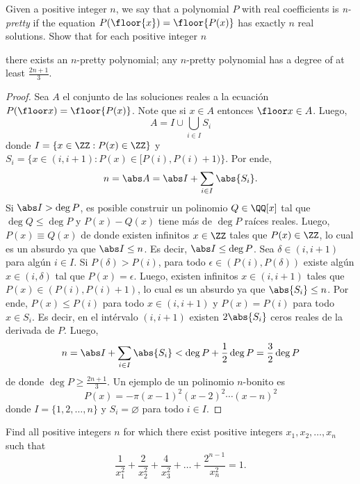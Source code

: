 \begin{probMB}[MEMO 2021 T-2]
	Given a positive integer $n$, we say that a polynomial $P$ with real coefficients is \emph{n-pretty} if the equation $P(\floor{x})=\floor{P(x)}$ has exactly $n$ real solutions. Show that for each positive integer $n$
	\begin{enumerate}[(a)]
		\ii there exists an $n$-pretty polynomial;
		\ii any $n$-pretty polynomial has a degree of at least $\frac{2n+1}{3}$.
	\end{enumerate}
\end{probMB}

\begin{proof}
	Sea $A$ el conjunto de las soluciones reales a la ecuación $P(\floor x)=\floor{P(x)}$. Note que si $x\in A$ entonces $\floor x\in A$. Luego,
	\[A=I\cup\bigcup_{i\in I}S_i\]
	donde $I=\{x\in\ZZ:P(x)\in\ZZ\}$ y $S_i=\{x\in(i,i+1):P(x)\in[P(i),P(i)+1)\}$. Por ende,
	\[n=\abs A=\abs I+\sum_{i\in I}\abs{S_i}.\]
	Si $\abs I>\deg P$, es posible construir un polinomio $Q\in\QQ[x]$ tal que $\deg Q\le\deg P$ y $P(x)-Q(x)$ tiene más de $\deg P$ raíces reales. Luego, $P(x)\equiv Q(x)$ de donde existen infinitos $x\in\ZZ$ tales que $P(x)\in\ZZ$, lo cual es un absurdo ya que $\abs I\le n$. Es decir, $\abs I\le\deg P$. Sea $\delta\in(i,i+1)$ para algún $i\in I$. Si $P(\delta)>P(i)$, para todo $\epsilon\in(P(i),P(\delta))$ existe algún $x\in(i,\delta)$ tal que $P(x)=\epsilon$. Luego, existen infinitos $x\in(i,i+1)$ tales que $P(x)\in(P(i),P(i)+1)$, lo cual es un absurdo ya que $\abs{S_i}\le n$. Por ende, $P(x)\le P(i)$ para todo $x\in(i,i+1)$ y $P(x)=P(i)$ para todo $x\in S_i$. Es decir, en el intérvalo $(i,i+1)$ existen $2\abs{S_i}$ ceros reales de la derivada de $P$. Luego,
	\[n=\abs I+\sum_{i\in I}\abs{S_i}<\deg P+\frac12\deg P=\frac32\deg P\]
	de donde $\deg P\ge\frac{2n+1}{3}$. Un ejemplo de un polinomio $n$-bonito es
	\[P(x)=-\pi(x-1)^2(x-2)^2\cdots(x-n)^2\]
	donde $I=\{1,2,\dots,n\}$ y $S_i=\varnothing$ para todo $i\in I$.
\end{proof}

\begin{probMG}[MEMO 2020 I-4]
	Find all positive integers $n$ for which there exist positive integers $x_1,x_2,\dots,x_n$ such that
	\[\frac{1}{x_1^2}+\frac{2}{x_2^2}+\frac{4}{x_3^2}+\dots+\frac{2^{n-1}}{x_n^2}=1.\]
\end{probMG}

